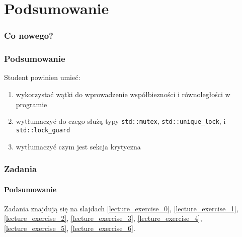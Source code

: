 \documentclass[aspectratio=169]{beamer}
\begin{document}
\section{Podsumowanie}

\begin{frame}
    \frametitle{Co nowego?}
    \frametitle{Podsumowanie}

    Student powinien umieć:

    \begin{enumerate}
        \item wykorzystać wątki do wprowadzenie współbiezności i równoległości w
            programie
        \item wytłumaczyć do czego służą typy \texttt{std::mutex},
            \texttt{std::unique\_lock}, i \texttt{std::lock\_guard}
        \item wytłumaczyć czym jest sekcja krytyczna
    \end{enumerate}
\end{frame}

\begin{frame}
    \frametitle{Zadania}
    \framesubtitle{Podsumowanie}

    Zadania znajdują się na slajdach
    \ref{lecture_exercise_0},
    \ref{lecture_exercise_1},
    \ref{lecture_exercise_2},
    \ref{lecture_exercise_3},
    \ref{lecture_exercise_4},
    \ref{lecture_exercise_5},
    \ref{lecture_exercise_6}.
\end{frame}
\end{document}
